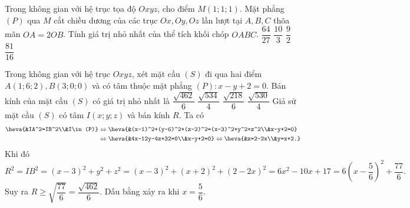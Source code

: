 \begin{ex}%
	Trong không gian với hệ trục tọa độ $Oxyz$, cho điểm $M(1;1;1)$. Mặt phẳng $(P)$ qua $M$ cắt chiều dương của các trục $Ox,Oy, Oz$ lần lượt tại $A,B,C$ thõa mãn $OA=2OB$. Tính giá trị nhỏ nhất của thể tích khối chóp $OABC$.
	\choice
	{$\dfrac{64}{27}$}
	{$\dfrac{10}{3}$}
	{$\dfrac{9}{2}$}
	{\True $\dfrac{81}{16}$}
\end{ex}
\begin{ex}%
	Trong không gian với hệ trục $Oxyz$, xét mặt cầu $(S)$ đi qua hai điểm $A(1; 6; 2),B(3; 0; 0)$ và có tâm thuộc mặt phẳng $(P): x-y+2=0$. Bán kính của mặt cầu $(S)$ có giá trị nhỏ nhất là
	\choice
	{\True $\dfrac{\sqrt{462}}{6}$}
	{$\dfrac{\sqrt{534}}{4}$}
	{ $\dfrac{\sqrt{218}}{6}$}
	{$\dfrac{\sqrt{530}}{4}$}
	\loigiai
	{
		Giả sử mặt cầu $(S)$ có tâm $I(x; y; z)$ và bán kính $R$. Ta có
		$$\begin{aligned}\heva{&IA^2=IB^2\\&I\in (P)}&\Leftrightarrow \heva{&(x-1)^2+(y-6)^2+(z-2)^2=(x-3)^2+y^2+z^2\\&x-y+2=0}\\
		&\Leftrightarrow\heva{&4x-12y-4z+32=0\\&x-y+2=0}\Leftrightarrow\heva{&z=2-2x\\&y=x+2.}
		\end{aligned}$$
		Khi đó
		$$R^2=IB^2=(x-3)^2+y^2+z^2=(x-3)^2+(x+2)^2+(2-2x)^2=6x^2-10x+17=6\left(x-\dfrac{5}{6}\right)^2+\dfrac{77}{6}.$$
		Suy ra $R\geq \sqrt{\dfrac{77}{6}}=\dfrac{\sqrt{462}}{6}$. Dấu bằng xảy ra khi $x=\dfrac{5}{6}$.	
	}
\end{ex}
